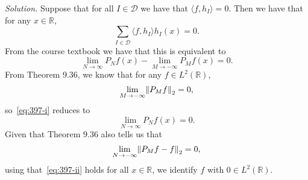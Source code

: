 \documentclass{article}
\newcommand{\R}{\mathbb{R}}
\newcommand{\D}{\mathcal{D}}
\begin{document}
\textit{Solution.}
Suppose that for all $I \in \D$ we have that $\langle f, h_I \rangle = 0$.
Then we have that for any $x \in \R$,
%
\begin{equation*}
    \sum_{I \in \D} \langle f, h_I \rangle h_I(x) = 0
    .
\end{equation*}
%
From the course textbook we have that this is equivalent to
%
\begin{equation}
    \lim_{N \to \infty} P_N f(x) - \lim_{M \to -\infty} P_M f(x) = 0
    \label{eq:397-i}
    .
\end{equation}
%
From Theorem 9.36, we know that for any $f \in L^2(\R)$,
%
\begin{equation*}
    \lim_{M \to - \infty} \norm{P_M f}_2 = 0,
\end{equation*}
%
so~\eqref{eq:397-i} reduces to
%
\begin{equation}
    \lim_{N \to \infty} P_N f(x) = 0
    \label{eq:397-ii}
    .
\end{equation}
%
Given that Theorem 9.36 also tells us that
%
\begin{equation*}
    \lim_{N \to - \infty} \norm{P_M f - f}_2 = 0,
\end{equation*}
%
using that~\eqref{eq:397-ii} holds for all $x \in \R$, we identify $f$
with $0 \in L^2(\R)$.
\end{document}
